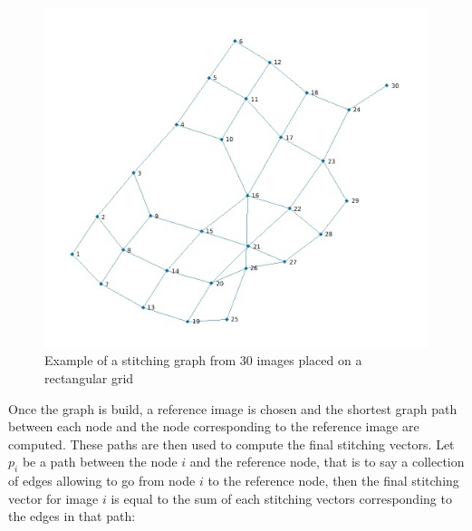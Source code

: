 \documentclass[12pt]{article}
\begin{document}
 
\begin{figure}[!h]
	\begin{center}
		\includegraphics[width=0.8\linewidth]{Graph_stitching.jpeg}
		\caption{Example of a stitching graph from 30 images placed on a rectangular grid}
		\label{Fig:Graph_stitching}
	\end{center}
\end{figure}


Once the graph is build, a reference image is chosen and the shortest graph path between each node and the node corresponding to the reference image are computed. These paths are then used to compute the final stitching vectors. Let $p_{i}$ be a path between the node $i$ and the reference node, that is to say a collection of edges allowing to go from node $i$ to the reference node, then the final stitching vector for image $i$ is equal to the sum of each stitching vectors corresponding to the edges in that path:



\end{document}
